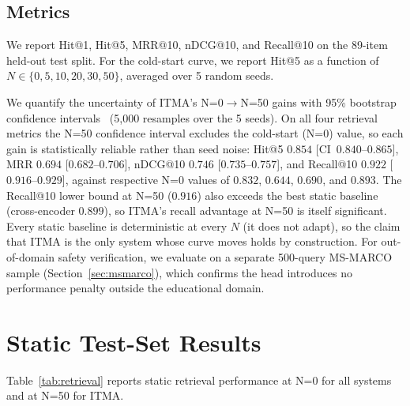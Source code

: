 \documentclass[preprint,12pt]{elsarticle}
\begin{document}
\subsection{Metrics}
We report Hit@1, Hit@5, MRR@10, nDCG@10, and Recall@10 on the 89-item held-out
test split.  For the cold-start curve, we report Hit@5 as a function of
$N\in\{0,5,10,20,30,50\}$, averaged over 5 random seeds.

We quantify the uncertainty of ITMA's N=0$\rightarrow$N=50 gains with 95\%
bootstrap confidence intervals~\citep{efron1993bootstrap} (5{,}000 resamples
over the 5 seeds).  On all four retrieval metrics the N=50 confidence interval
excludes the cold-start (N=0) value, so each gain is statistically reliable
rather than seed noise: Hit@5 $0.854$ [CI~$0.840$--$0.865$], MRR $0.694$
[$0.682$--$0.706$], nDCG@10 $0.746$ [$0.735$--$0.757$], and Recall@10 $0.922$
[$0.916$--$0.929$], against respective N=0 values of $0.832$, $0.644$,
$0.690$, and $0.893$.  The Recall@10 lower bound at N=50 ($0.916$) also
exceeds the best static baseline (cross-encoder $0.899$), so ITMA's recall
advantage at N=50 is itself significant.  Every static baseline is
deterministic at every $N$ (it does not adapt), so the claim that ITMA is the
only system whose curve moves holds by construction.  For out-of-domain safety
verification, we evaluate on a separate 500-query MS-MARCO sample
(Section~\ref{sec:msmarco}), which confirms the head introduces no performance
penalty outside the educational domain.

\section{Static Test-Set Results}
\label{sec:static}

Table~\ref{tab:retrieval} reports static retrieval performance at N=0 for all
systems and at N=50 for ITMA.
\end{document}
